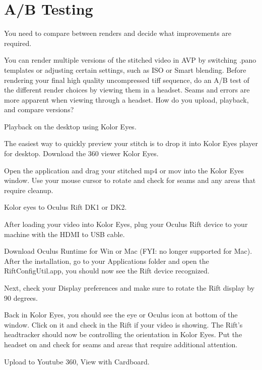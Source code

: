 \chapter{A/B Testing}
\pagecolor{white}
\label{chap:46}
\begin{fullwidth}

\problem

{\large You need to compare between renders and decide what improvements are required. \par}

You can render multiple versions of the stitched video in AVP by switching .pano templates or adjusting certain settings, such as ISO or Smart blending. Before rendering your final high quality uncompressed tiff sequence, do an A/B test of the different render choices by viewing them in a headset. Seams and errors are more apparent when viewing through a headset. How do you upload, playback, and compare versions?

\solutions

{\large Playback on the desktop using Kolor Eyes. \par}

The easiest way to quickly preview your stitch is to drop it into Kolor Eyes player for desktop. Download the 360 viewer Kolor Eyes.

Open the application and drag your stitched mp4 or mov into the Kolor Eyes window. Use your mouse cursor to rotate and check for seams and any areas that require cleanup. 

{\large Kolor eyes to Oculus Rift DK1 or DK2. \par}

After loading your video into Kolor Eyes, plug your Oculus Rift device to your machine with the HDMI to USB cable.

Download Oculus Runtime for Win or Mac (FYI: no longer supported for Mac). After the installation, go to your Applications folder and open the RiftConfigUtil.app, you should now see the Rift device recognized.

Next, check your Display preferences and make sure to rotate the Rift display by 90 degrees.

Back in Kolor Eyes, you should see the eye or Oculus icon at bottom of the window. Click on it and check in the Rift if your video is showing. The Rift’s headtracker should now be controlling the orientation in Kolor Eyes. Put the headset on and check for seams and areas that require additional attention.

{\large Upload to Youtube 360, View with Cardboard. \par}


\end{fullwidth}
